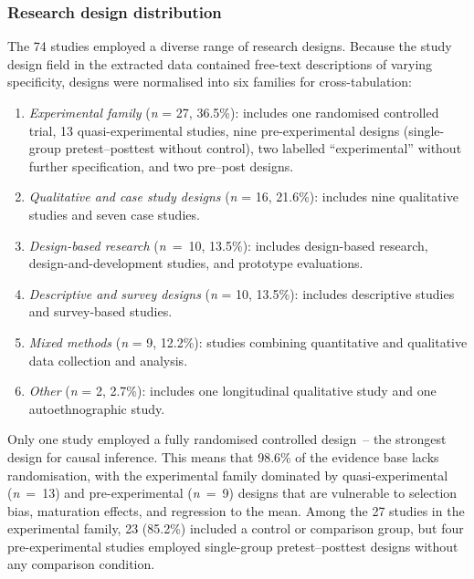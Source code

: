 \documentclass[etq]{acnsart}
\begin{document}
	\subsubsection{Research design distribution}
	\label{sec:results_rq1_design}
	
	The 74 studies employed a diverse range of research designs. Because the study design field in the extracted data contained free-text descriptions of varying specificity, designs were normalised into six families for cross-tabulation:
	
	\begin{enumerate}%
		\item \textit{Experimental family} (\textit{n} = 27, 36.5\%): includes one randomised controlled trial, 13 quasi-experimental studies, nine pre-experimental designs (single-group pretest--posttest without control), two labelled ``experimental'' without further specification, and two pre--post designs.
		\item \textit{Qualitative and case study designs} (\textit{n} = 16, 21.6\%): includes nine qualitative studies and seven case studies.
		\item \textit{Design-based research} (\textit{n}~=~10, 13.5\%): includes design-based research, design-and-development studies, and prototype evaluations.
		\item \textit{Descriptive and survey designs} (\textit{n} = 10, 13.5\%): includes descriptive studies and survey-based studies.
		\item \textit{Mixed methods} (\textit{n} = 9, 12.2\%): studies combining quantitative and qualitative data collection and analysis.
		\item \textit{Other} (\textit{n} = 2, 2.7\%): includes one longitudinal qualitative study and one autoethnographic study.
	\end{enumerate}
	
	Only one study \cite{74Fendt2019} employed a fully randomised controlled design~-- the strongest design for causal inference. This means that 98.6\% of the evidence base lacks randomisation, with the experimental family dominated by quasi-experimental (\textit{n}~=~13) and pre-experimental (\textit{n}~=~9) designs that are vulnerable to selection bias, maturation effects, and regression to the mean. Among the 27 studies in the experimental family, 23 (85.2\%) included a control or comparison group, but four pre-experimental studies employed single-group pretest--posttest designs without any comparison condition.
	
\end{document}
